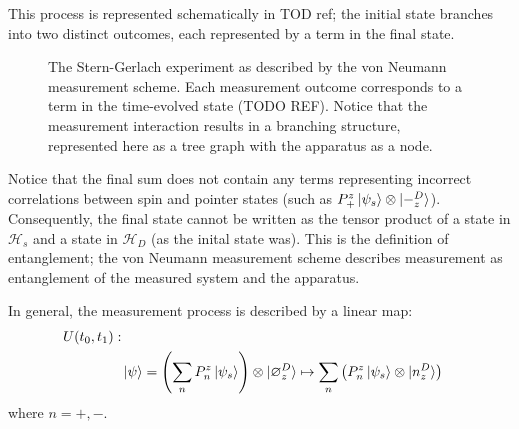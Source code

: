 This process is represented schematically in TOD ref; the initial state branches into two distinct outcomes, each represented by a term in the final state.

\begin{figure}
\centering\CaptionFontSize
{}

\caption[Insert an abbreviated caption here to show in the List of Figures]
{The Stern-Gerlach experiment as described by the von Neumann measurement scheme. Each measurement outcome corresponds to a term in the time-evolved state (TODO REF). Notice that the measurement interaction results in a branching structure, represented here as a tree graph with the apparatus as a node.}
\label{Figure:Measurement:DetectorStates}
\end{figure}

Notice that the final sum does not contain any terms representing incorrect correlations between spin and pointer states (such as $ P^z_+ \ket{\psi_s} \otimes \ket{-^D_z}$).  Consequently, the final state cannot be written as the tensor product of a state in $\mathcal{H}_s$ and a state in $\mathcal{H}_D$ (as the inital state was). This is the definition of entanglement; the von Neumann measurement scheme describes measurement as entanglement of the measured system and the apparatus.

In general, the measurement process is described by a linear map:
\begin{align}
    \nonumber U(t_0, t_1): \\
    & \ket{\psi} = \left(\sum_{n} P^z_n\ket{\psi_s}\right) \otimes \ket{\varnothing^D_z} \mapsto \sum_{n}\left(P^z_n\ket{\psi_s} \otimes \ket{n^D_z}\right)
\end{align}
where $n = +, -$.

